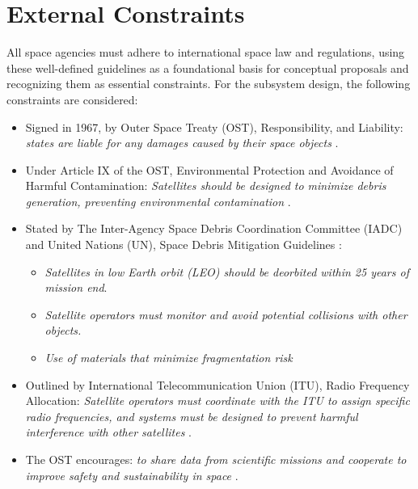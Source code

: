 \section{External Constraints}
All space agencies must adhere to international space law and regulations, using these well-defined guidelines as a foundational basis for conceptual proposals and recognizing them as essential constraints. For the subsystem design, the following constraints are considered:
\begin{itemize}
    \item Signed in 1967, by Outer Space Treaty (OST), Responsibility, and Liability: \textit{states are liable for any damages caused by their space objects} \cite{un1967ost}. 
    \item Under Article IX of the OST, Environmental Protection and Avoidance of Harmful Contamination: \textit{Satellites should be designed to minimize debris generation, preventing environmental contamination} \cite{un1972liability}.
    \item Stated by The Inter-Agency Space Debris Coordination Committee (IADC) and United Nations (UN), Space Debris Mitigation Guidelines \cite{un1967environment}:
    \begin{itemize}
        \item \textit{Satellites in low Earth orbit (LEO) should be deorbited within 25 years of mission end}.
        \item \textit{Satellite operators must monitor and avoid potential collisions with other objects.}
        \item \textit{Use of materials that minimize fragmentation risk}
    \end{itemize}
    \item Outlined by International Telecommunication Union (ITU), Radio Frequency Allocation: \textit{Satellite operators must coordinate with the ITU to assign specific radio frequencies, and systems must be designed to prevent harmful interference with other satellites} \cite{itu2008radio}.
    \item The OST encourages: \textit{to share data from scientific missions and cooperate to improve safety and sustainability in space }\cite{un1967ost}.

\end{itemize}